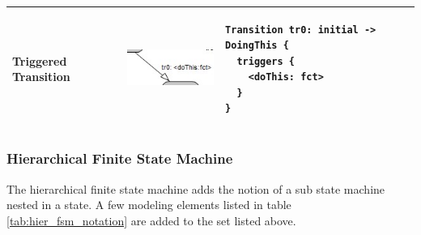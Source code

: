 \begin{table}
\begin{tabular}{|m{3cm}|c|m{7cm}|}
\\
\hline
 Triggered Transition & \includegraphics[scale=0.7]{images/040-TriggeredTransition.jpg} & 
\begin{lstlisting}
Transition tr0: initial -> DoingThis {
  triggers {
    <doThis: fct>
  }
}
\end{lstlisting}
\\
\hline
\end{tabular}
\end{table}


\subsubsection*{Hierarchical Finite State Machine}

The hierarchical finite state machine adds the notion of a sub state machine nested in a state.
A few modeling elements listed in table \ref{tab:hier_fsm_notation} are added to the set listed above.

